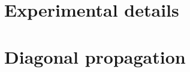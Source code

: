 {%



\begin{lemma}
\label{lemma:correlated-weights-nn}
\end{lemma}

}%

\section{Experimental details \label{app:experimental}}

\section{Diagonal propagation}
